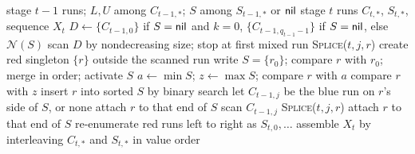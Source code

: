 \begin{myalgorithm}
\begin{algorithmic}[1]
\REQUIRE stage $t-1$ runs; $L, U$ among $C_{t-1,*}$; $S$ among $S_{t-1,*}$ or $\textsf{nil}$
\ENSURE stage $t$ runs $C_{t,*}$, $S_{t,*}$, sequence $X_t$
  \STATE $D \gets \{C_{t-1,0}\}$ if $S = \textsf{nil}$ and $k = 0$, $\{C_{t-1,q_{t-1}-1}\}$ if $S = \textsf{nil}$, else $\mathcal N(S)$ 
  \STATE scan $D$ by nondecreasing size; stop at first mixed run
    \STATE \textsc{Splice}($t, j, r$) 
  \ELSE
      \STATE create red singleton $\{r\}$ outside the scanned run
    \ELSE
      \STATE write $S = \{r_0\}$; compare $r$ with $r_0$; merge in order; activate $S$
    \ENDIF
  \ENDIF
\ELSE
  \STATE $a \gets \min S$; $z \gets \max S$; compare $r$ with $a$ 
    \STATE compare $r$ with $z$
  \ENDIF
    \STATE insert $r$ into sorted $S$ by binary search 
  \ELSE
    \STATE let $C_{t-1,j}$ be the blue run on $r$'s side of $S$, or none
      \STATE attach $r$ to that end of $S$
    \ELSE
      \STATE scan $C_{t-1,j}$
        \STATE \textsc{Splice}($t, j, r$)
      \ELSE
        \STATE attach $r$ to that end of $S$
      \ENDIF
    \ENDIF
  \ENDIF
\ENDIF
\STATE re-enumerate red runs left to right as $S_{t,0}, \dots$
\STATE assemble $X_t$ by interleaving $C_{t,*}$ and $S_{t,*}$ in value order
\end{algorithmic}
\end{myalgorithm}
